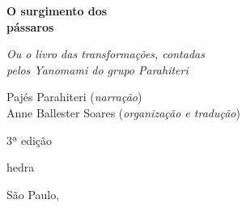 




\begingroup\thispagestyle{empty}\vspace*{.05\textheight} 

              {\formular
              \huge
              \noindent
              \textbf{O surgimento dos\\ 
              pássaros}\\
              
              \vspace{-0.5cm}
              
              }

              \vspace{0.5cm}

              \noindent{}\textit{Ou o livro das transformações, contadas\\pelos Yanomami do  grupo Parahiteri}

    
            \vfill              
     {\small
              \noindent{}Pajés Parahiteri (\textit{narração})\vspace{0.2cm}\\
                          \noindent{}Anne Ballester Soares (\textit{organização e tradução})
              }

          
              \vspace{0.5cm}

              {\small\noindent{}3ª edição}

              \vfill
              \newfontfamily{}
              {\noindent\fontsize{30}{40}\selectfont\timesnewroman hedra}

              {\small\timesnewroman\noindent São Paulo, \the\year}

\endgroup
\pagebreak
